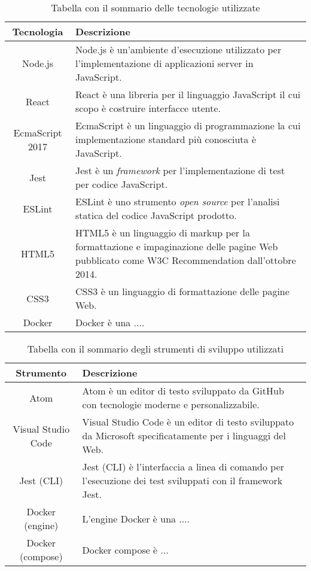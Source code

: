 \begin{table}[H]
\caption{Tabella con il sommario delle tecnologie utilizzate}
\label{tab:tecnologie}
\begin{tabularx}{\linewidth}{|c|X|}
\hline
\textbf{Tecnologia} & \textbf{Descrizione}\\
\hline
Node.js & Node.js è un'ambiente d'esecuzione utilizzato per l'implementazione di applicazioni server in JavaScript. \\
\hline
React & React è una libreria per il linguaggio JavaScript il cui scopo è costruire interfacce utente. \\
\hline
EcmaScript 2017 & EcmaScript è un linguaggio di programmazione la cui implementazione standard più conosciuta è JavaScript. \\
\hline
Jest & Jest è un \emph{framework} per l'implementazione di test per codice JavaScript. \\
\hline
ESLint & ESLint è uno strumento \emph{open source} per l'analisi statica del codice JavaScript prodotto. \\
\hline
HTML5 & HTML5 è un linguaggio di markup per la formattazione e impaginazione delle pagine Web pubblicato come W3C Recommendation dall'ottobre 2014. \\
\hline
CSS3 & CSS3 è un linguaggio di formattazione delle pagine Web. \\
\hline
Docker & Docker è una .... \\
\hline
\end{tabularx}
\end{table}

\begin{table}[H]
\caption{Tabella con il sommario degli strumenti di sviluppo utilizzati}
\label{tab:strumenti}
\begin{tabularx}{\linewidth}{|c|X|}
\hline
\textbf{Strumento} & \textbf{Descrizione}\\
\hline
Atom & Atom è un editor di testo sviluppato da GitHub con tecnologie moderne e personalizzabile. \\
\hline
Visual Studio Code & Visual Studio Code è un editor di testo sviluppato da Microsoft specificatamente per i linguaggi del Web. \\
\hline
Jest (CLI) & Jest (CLI) è l'interfaccia a linea di comando per l'esecuzione dei test sviluppati con il framework Jest. \\
\hline
Docker (engine) & L'engine Docker è una .... \\
\hline
Docker (compose) & Docker compose è ... \\
\hline
\end{tabularx}
\end{table}

